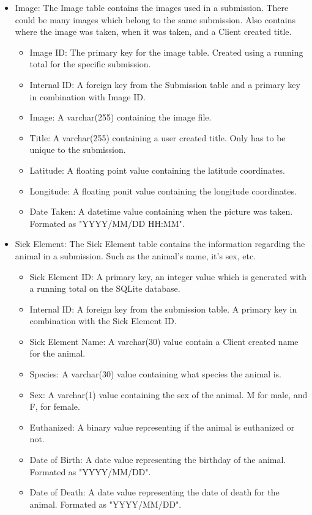 \documentclass[onecolumn, draftclsnofoot,10pt, compsoc]{IEEEtran}
\begin{document}
\begin{itemize}
\item Image:\newline
The Image table contains the images used in a submission. There could be many images which belong to the same submission. Also contains where the image was taken, when it was taken, and a Client created title.
\begin{itemize}
\item Image ID: The primary key for the image table. Created using a running total for the specific submission.
\item Internal ID: A foreign key from the Submission table and a primary key in combination with Image ID.
\item Image: A varchar(255) containing the image file.
\item Title: A varchar(255) containing a user created title. Only has to be unique to the submission. 
\item Latitude: A floating point value containing the latitude coordinates.
\item Longitude: A floating ponit value containing the longitude coordinates.
\item Date Taken: A datetime value containing when the picture was taken. Formated as "YYYY/MM/DD HH:MM".
\end{itemize}

\item Sick Element:\newline
The Sick Element table contains the information regarding the animal in a submission. Such as the animal's name, it's sex, etc.
\begin{itemize}
\item Sick Element ID: A primary key, an integer value which is generated with a running total on the SQLite database.
\item Internal ID: A foreign key from the submission table. A primary key in combination with the Sick Element ID.
\item Sick Element Name: A varchar(30) value contain a Client created name for the animal.
\item Species: A varchar(30) value containing what species the animal is.
\item Sex: A varchar(1) value containing the sex of the animal. M for male, and F, for female.
\item Euthanized: A binary value representing if the animal is euthanized or not.
\item Date of Birth: A date value representing the birthday of the animal. Formated as "YYYY/MM/DD".
\item Date of Death: A date value representing the date of death for the animal. Formated as "YYYY/MM/DD".
\end{itemize}


\end{itemize}
\end{document}
